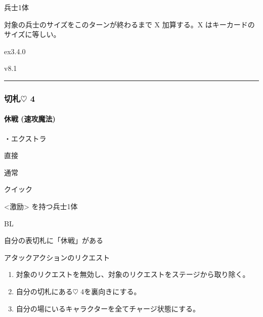 \documentclass[letterpaper,10pt,dvipdfmx]{sphinxmanual}
\begin{document}
\sphinxAtStartPar
兵士1体

\sphinxAtStartPar
{}

\sphinxAtStartPar
対象の兵士のサイズをこのターンが終わるまで X 加算する。X はキーカードのサイズに等しい。

\sphinxAtStartPar
{}  ex3.4.0

\sphinxAtStartPar
{}  v8.1


\bigskip\hrule\bigskip



\subsubsection{切札{\normalsize $\heartsuit$} 4}
\label{\detokenize{auto/frameActionlist:id35}}

\paragraph{休戦 (速攻魔法)}
\label{\detokenize{auto/frameActionlist:act-retreat}}\label{\detokenize{auto/frameActionlist:id36}}
\sphinxAtStartPar
{}

\sphinxAtStartPar
・エクストラ

\sphinxAtStartPar
{} 直接

\sphinxAtStartPar
{} 通常

\sphinxAtStartPar
{} クイック

\sphinxAtStartPar
{} \textless{}激励\textgreater{} を持つ兵士1体

\sphinxAtStartPar
{} BL

\sphinxAtStartPar
{}

\sphinxAtStartPar
自分の表切札に「休戦」がある

\sphinxAtStartPar
{}

\sphinxAtStartPar
アタックアクションのリクエスト

\sphinxAtStartPar
{}
\begin{enumerate}
%
\item {} 
\sphinxAtStartPar
対象のリクエストを無効し、対象のリクエストをステージから取り除く。

\item {} 
\sphinxAtStartPar
自分の切札にある{\normalsize $\heartsuit$} 4を裏向きにする。

\item {} 
\sphinxAtStartPar
自分の場にいるキャラクターを全てチャージ状態にする。

\end{enumerate}
\end{document}
